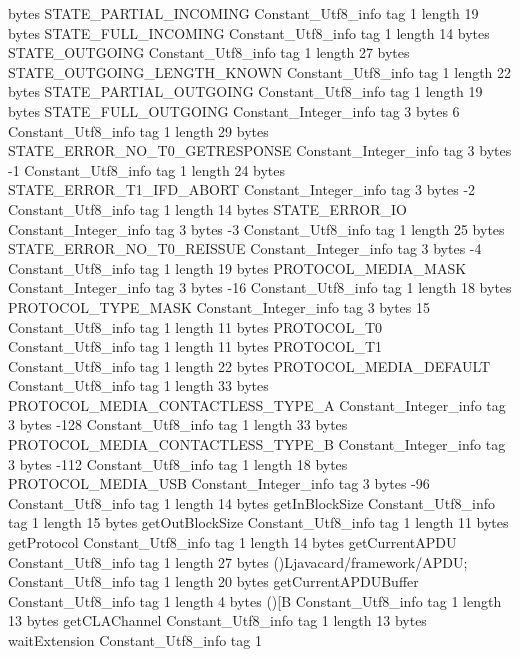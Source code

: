{{{			bytes	STATE_PARTIAL_INCOMING
		}
		Constant_Utf8_info {
			tag	1
			length	19
			bytes	STATE_FULL_INCOMING
		}
		Constant_Utf8_info {
			tag	1
			length	14
			bytes	STATE_OUTGOING
		}
		Constant_Utf8_info {
			tag	1
			length	27
			bytes	STATE_OUTGOING_LENGTH_KNOWN
		}
		Constant_Utf8_info {
			tag	1
			length	22
			bytes	STATE_PARTIAL_OUTGOING
		}
		Constant_Utf8_info {
			tag	1
			length	19
			bytes	STATE_FULL_OUTGOING
		}
		Constant_Integer_info {
			tag	3
			bytes	6
		}
		Constant_Utf8_info {
			tag	1
			length	29
			bytes	STATE_ERROR_NO_T0_GETRESPONSE
		}
		Constant_Integer_info {
			tag	3
			bytes	-1
		}
		Constant_Utf8_info {
			tag	1
			length	24
			bytes	STATE_ERROR_T1_IFD_ABORT
		}
		Constant_Integer_info {
			tag	3
			bytes	-2
		}
		Constant_Utf8_info {
			tag	1
			length	14
			bytes	STATE_ERROR_IO
		}
		Constant_Integer_info {
			tag	3
			bytes	-3
		}
		Constant_Utf8_info {
			tag	1
			length	25
			bytes	STATE_ERROR_NO_T0_REISSUE
		}
		Constant_Integer_info {
			tag	3
			bytes	-4
		}
		Constant_Utf8_info {
			tag	1
			length	19
			bytes	PROTOCOL_MEDIA_MASK
		}
		Constant_Integer_info {
			tag	3
			bytes	-16
		}
		Constant_Utf8_info {
			tag	1
			length	18
			bytes	PROTOCOL_TYPE_MASK
		}
		Constant_Integer_info {
			tag	3
			bytes	15
		}
		Constant_Utf8_info {
			tag	1
			length	11
			bytes	PROTOCOL_T0
		}
		Constant_Utf8_info {
			tag	1
			length	11
			bytes	PROTOCOL_T1
		}
		Constant_Utf8_info {
			tag	1
			length	22
			bytes	PROTOCOL_MEDIA_DEFAULT
		}
		Constant_Utf8_info {
			tag	1
			length	33
			bytes	PROTOCOL_MEDIA_CONTACTLESS_TYPE_A
		}
		Constant_Integer_info {
			tag	3
			bytes	-128
		}
		Constant_Utf8_info {
			tag	1
			length	33
			bytes	PROTOCOL_MEDIA_CONTACTLESS_TYPE_B
		}
		Constant_Integer_info {
			tag	3
			bytes	-112
		}
		Constant_Utf8_info {
			tag	1
			length	18
			bytes	PROTOCOL_MEDIA_USB
		}
		Constant_Integer_info {
			tag	3
			bytes	-96
		}
		Constant_Utf8_info {
			tag	1
			length	14
			bytes	getInBlockSize
		}
		Constant_Utf8_info {
			tag	1
			length	15
			bytes	getOutBlockSize
		}
		Constant_Utf8_info {
			tag	1
			length	11
			bytes	getProtocol
		}
		Constant_Utf8_info {
			tag	1
			length	14
			bytes	getCurrentAPDU
		}
		Constant_Utf8_info {
			tag	1
			length	27
			bytes	()Ljavacard/framework/APDU;
		}
		Constant_Utf8_info {
			tag	1
			length	20
			bytes	getCurrentAPDUBuffer
		}
		Constant_Utf8_info {
			tag	1
			length	4
			bytes	()[B
		}
		Constant_Utf8_info {
			tag	1
			length	13
			bytes	getCLAChannel
		}
		Constant_Utf8_info {
			tag	1
			length	13
			bytes	waitExtension
		}
		Constant_Utf8_info {
			tag	1
}}}
